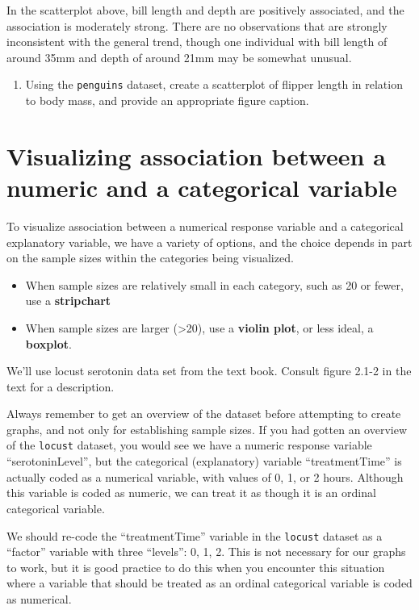 \documentclass[
]{book}
\providecommand{\tightlist}{%
  \setlength{\itemsep}{0pt}\setlength{\parskip}{0pt}}
\begin{document}
In the scatterplot above, bill length and depth are positively associated, and the association is moderately strong. There are no observations that are strongly inconsistent with the general trend, though one individual with bill length of around 35mm and depth of around 21mm may be somewhat unusual.

\begin{enumerate}
\def\labelenumi{\arabic{enumi}.}
\tightlist
\item
  Using the \texttt{penguins} dataset, create a scatterplot of flipper length in relation to body mass, and provide an appropriate figure caption.
\end{enumerate}

\section{Visualizing association between a numeric and a categorical variable}\label{numeric_vs_cat}

To visualize association between a numerical response variable and a categorical explanatory variable, we have a variety of options, and the choice depends in part on the sample sizes within the categories being visualized.

\begin{itemize}
\tightlist
\item
  When sample sizes are relatively small in each category, such as 20 or fewer, use a \textbf{stripchart}
\item
  When sample sizes are larger (\textgreater20), use a \textbf{violin plot}, or less ideal, a \textbf{boxplot}.
\end{itemize}

We'll use locust serotonin data set from the text book. Consult figure 2.1-2 in the text for a description.

Always remember to get an overview of the dataset before attempting to create graphs, and not only for establishing sample sizes. If you had gotten an overview of the \texttt{locust} dataset, you would see we have a numeric response variable ``serotoninLevel'', but the categorical (explanatory) variable ``treatmentTime'' is actually coded as a numerical variable, with values of 0, 1, or 2 hours. Although this variable is coded as numeric, we can treat it as though it is an ordinal categorical variable.

We should re-code the ``treatmentTime'' variable in the \texttt{locust} dataset as a ``factor'' variable with three ``levels'': 0, 1, 2. This is not necessary for our graphs to work, but it is good practice to do this when you encounter this situation where a variable that should be treated as an ordinal categorical variable is coded as numerical.
\end{document}
